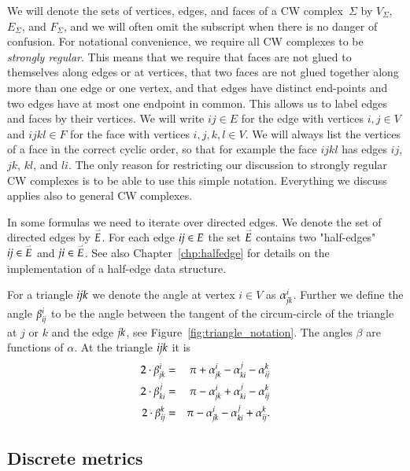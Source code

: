 \documentclass[Thesis]{subfiles}
\begin{document}
We will denote the sets of vertices, edges, and faces of a CW complex~$\Sigma$ by $V_{\Sigma}$, $E_{\Sigma}$, and $F_{\Sigma}$, and we will often omit the subscript when there is no danger of confusion.
For notational convenience, we require all CW complexes to be \emph{strongly regular}. 
This means that we require that faces are not glued to themselves along edges or at vertices, that two faces are not glued together along more than one edge or one vertex, and that edges have distinct end-points and two edges have at most one endpoint in common. 
This allows us to label edges and faces by their vertices. 
We will write $\mathit{ij}\in E$ for the edge with vertices $i,j\in V$ and $\mathit{ijkl}\in F$ for the face with vertices $i,j,k,l\in V$. 
We will always list the vertices of a face in the correct cyclic order, so that for example the face $\mathit{ijkl}$ has edges $\mathit{ij}$, $\mathit{jk}$, $\mathit{kl}$, and $\mathit{li}$.
The only reason for restricting our discussion to strongly regular CW complexes is to be able to use this simple notation. 
Everything we discuss applies also to general CW complexes.

In some formulas we need to iterate over directed edges. 
We denote the set of directed edges by $\accentset{\rightharpoonup}{E}$. 
For each edge $\it ij\in E$ the set $\accentset{\rightharpoonup}{E}$ contains two "half-edges" $\it ij\in \accentset{\rightharpoonup}{E}$ and $\it ji \in \accentset{\rightharpoonup}{E}$.
See also Chapter~\ref{chp:halfedge} for details on the implementation of a half-edge data structure.

For a triangle $\it ijk$ we denote the angle at vertex $i\in V$ as $\alpha^i_{\it jk}$. 
Further we define the angle $\beta^i_{\it ij}$ to be the angle between the tangent of the circum-circle of the triangle at $j$ or $k$ and the edge $\it jk$, see Figure~\ref{fig:triangle_notation}.
The angles $\beta$ are functions of $\alpha$. At the triangle $\it ijk$ it is
\begin{eqnarray*}
	2\cdot\beta_{\it jk}^i &=& \pi + \alpha_{\it jk}^i - \alpha_{\it ki}^j - \alpha_{\it ij}^k\\
	2\cdot\beta_{\it ki}^j &=& \pi - \alpha_{\it jk}^i + \alpha_{\it ki}^j - \alpha_{\it ij}^k\\
	2\cdot\beta_{\it ij}^k &=& \pi - \alpha_{\it jk}^i - \alpha_{\it ki}^j + \alpha_{\it ij}^k.
\end{eqnarray*}

\subsection{Discrete metrics}
\label{sec:discrete-metrics}
\end{document}
